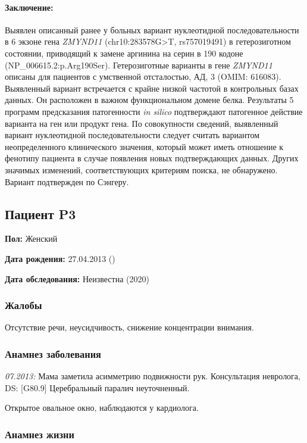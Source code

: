 \documentclass[a4paper,14pt]{extarticle}
\newcommand{\genename}[1]{\textit{#1}}
\newcommand{\pdate}[1]{\emph{#1:} }
\newcommand{\DS}[2]{[#2] #1}
\begin{document}
\paragraph{Заключение:} Выявлен описанный ранее у больных вариант нуклеотидной последовательности в 6 экзоне гена \genename{ZMYND11} (chr10:283578G>T, rs757019491) в гетерозиготном состоянии, приводящий к замене аргинина на серин в 190 кодоне (NP\_006615.2:p.Arg190Ser).
Гетерозиготные варианты в гене \genename{ZMYND11} описаны для пациентов с умственной отсталостью, АД, 3 (OMIM: 616083).
Выявленный вариант встречается с крайне низкой частотой  в контрольных базах данных.
Он расположен в важном функциональном домене белка.
Результаты 5 программ предсказания патогенности \textit{in silico} подтверждают патогенное действие варианта на ген или продукт гена.
По совокупности сведений, выявленный вариант нуклеотидной последовательности следует считать вариантом неопределенного клинического значения, который может иметь отношение к фенотипу пациента в случае появления новых подтверждающих данных.
Других значимых изменений, соответствующих критериям поиска, не обнаружено.
Вариант подтвержден по Сэнгеру.

\newpage
\subsection*{Пациент P3}

\textbf{Пол:} Женский

\textbf{Дата рождения:} 27.04.2013 ()

\textbf{Дата обследования:} Неизвестна (2020)

\subsubsection*{Жалобы}

Отсутствие речи, неусидчивость, снижение концентрации внимания.

\subsubsection*{Анамнез заболевания}

\pdate{07.2013} Мама заметила асимметрию подвижности рук. Консультация невролога, DS: \DS{Церебральный паралич неуточненный}{G80.9}.

Открытое овальное окно, наблюдаются у кардиолога.

\subsubsection*{Анамнез жизни}
\end{document}
